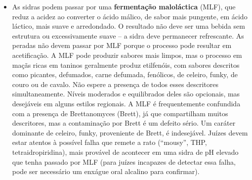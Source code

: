 \begin{itemize}
\item As sidras podem passar por uma \textbf{fermentação maloláctica} (MLF), que reduz a acidez ao converter o ácido málico, de sabor mais pungente, em ácido láctico, mais suave e arredondado. O resultado não deve ser uma bebida sem estrutura ou excessivamente suave – a sidra deve permanecer refrescante. As peradas não devem passar por MLF porque o processo pode resultar em acetificação. A MLF pode produzir sabores mais limpos, mas o processo em maçãs ricas em taninos geralmente produz etilfenóis, com sabores descritos como picantes, defumados, carne defumada, fenólicos, de celeiro, funky, de couro ou de cavalo. Não espere a presença de todos esses descritores simultaneamente. Níveis moderados e equilibrados deles são opcionais, mas desejáveis em alguns estilos regionais. A MLF é frequentemente confundida com a presença de Brettanomyces (Brett), já que compartilham muitos descritores, mas a contaminação por Brett é um defeito sério. Um caráter dominante de celeiro, funky, proveniente de Brett, é indesejável. Juízes devem estar atentos à possível falha que remete a rato (“mousy”, THP, tetraidropiridina), mais provável de acontecer em uma sidra de pH elevado que tenha passado por MLF (para juízes incapazes de detectar essa falha, pode ser necessário um enxágue oral alcalino para confirmar).
\end{itemize}
